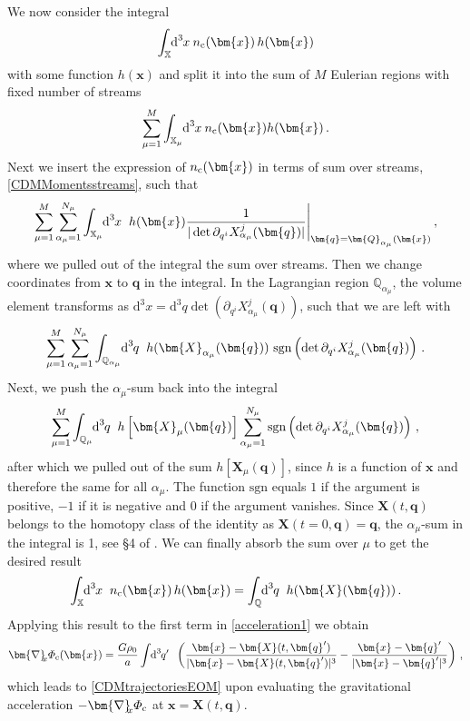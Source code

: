 \documentclass[twocolumn, nofootinbib, showpacs, superscriptaddress]{revtex4-1}
\renewcommand{\c}[0]{{\rm{c}}}
\newcommand{\vol}[2]{\hspace{-0.8mm}\mbox{$\text{d}^{\hspace{-0.0mm}#1}$}\hspace{-0.2mm}#2\hspace{0.8mm}\ }
\newcommand{\vx}[0]{\bm{x} }
\newcommand{\vX}[0]{\bm{X} }
\newcommand{\vq}[0]{\bm{q} }
\newcommand{\vQ}[0]{\bm{Q} }
\newcommand{\vnabla}[0]{\bm{\nabla} }
\begin{document}
We now consider the integral
\begin{equation}
 \int_{\mathbb{X}} \vol{3}{x} \!\!n_\c(\vx)\,  h(\vx)
\end{equation}
with some function $h(\vx)$ and split it into the sum of $M$ Eulerian regions with fixed number of streams
\begin{equation}
 \sum_{\mu =1}^M \int_{\mathbb{X}_\mu} \vol{3}{x} \!\!n_\c(\vx)  h(\vx)\,.
\end{equation}
Next we insert the expression of $n_\c(\vx)$ in terms of sum over streams, \eqref{CDMMomentsstreams}, such that
\begin{equation}
 \sum_{\mu =1}^M  \sum_{\alpha_\mu=1}^{N_\mu}  \int_{\mathbb{X}_\mu} \vol{3}{x} h(\vx) \frac{1}{|\det \partial_{q^i} X^j_{\alpha_\mu}(\vq)|}\Bigg|_{\vq=\vQ_{\alpha_\mu}(\vx)}  \,,
\end{equation}
where we pulled out of the integral the sum over streams. Then we change coordinates from $\vx$ to $\vq$ in the integral. In the Lagrangian region $\mathbb{Q}_{\alpha_\mu}$, the volume element transforms as $\mathrm{d}^3\! x =\mathrm{d}^3 \!q \det\left(\partial_{q^i} X^j_{\alpha_\mu}(\vq) \right)$, such that we are left with  
\begin{equation}
 \sum_{\mu =1}^M  \sum_{\alpha_\mu=1}^{N_\mu}  \int_{\mathbb{Q}_{\alpha_\mu}} \vol{3}{q} h(\vX_{\alpha_\mu}(\vq))\ \mathrm{sgn}\left(\det \partial_{q^i} X^j_{\alpha_\mu}(\vq) \right)\,.
\end{equation}
Next, we push the $\alpha_\mu$-sum back into the integral 
\begin{equation}
 \sum_{\mu =1}^M  \int_{\mathbb{Q}_{\mu}} \vol{3}{q} h\left[\vX_\mu(\vq)\right] 
  \sum_{\alpha_\mu=1}^{N_\mu} \mathrm{sgn}\left(\det \partial_{q^i} X^j_{\alpha_\mu}(\vq) \right)\,,
\end{equation}
after which we pulled out of the sum $h[\vX_\mu(\vq)]$, since $h$ is a function of $\vx$ and therefore the same for all $\alpha_\mu$. 
The function $\mathrm{sgn}$ equals $1$ if the argument is positive, $-1$ if it is negative and $0$ if the argument vanishes. 
Since $\vX(t,\vq)$ belongs to the homotopy class of the identity as $\vX(t\!=\!0,\vq)=\vq$, 
the $\alpha_\mu$-sum in the integral is 1, see  \S4 of \cite{Milnor1988}.
We can finally absorb the sum over $\mu$ to get the desired result
\begin{equation} \label{EulerToLagrange}
 \int_{\mathbb{X}}  \vol{3}{x} n_\c(\vx) \, h(\vx)=  \int_{\mathbb{Q}} \vol{3}{q} h(\vX(\vq)) \,.
 \end{equation}
Applying this result to the first term in  \eqref{acceleration1} we obtain
\begin{equation}
\vnabla_{\!\!x} \varPhi_\c(\vx) = \frac{ G \rho_0}{a}  \int \vol{3}{q'} \left( \frac{\vx -\vX(t,\vq')}{|\vx -\vX(t,\vq')|^3} - \frac{\vx -\vq'}{|\vx -\vq'|^3} \right)\,,
\end{equation}
which leads to \eqref{CDMtrajectoriesEOM} upon evaluating the gravitational acceleration $-\vnabla_{\!\!x} \varPhi_\c$ at $\vx=\vX(t,\vq)$.
\end{document}
